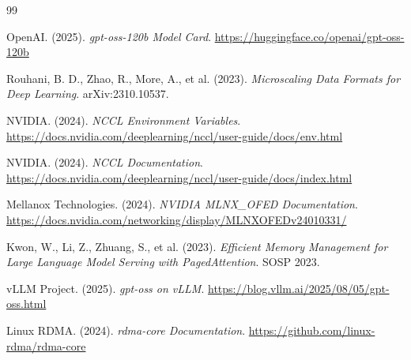 \documentclass[10pt,letterpaper]{article}
\begin{document}
\begin{thebibliography}{99}

OpenAI. (2025). \textit{gpt-oss-120b Model Card}. \url{https://huggingface.co/openai/gpt-oss-120b}

Rouhani, B. D., Zhao, R., More, A., et al. (2023). \textit{Microscaling Data Formats for Deep Learning}. arXiv:2310.10537.

NVIDIA. (2024). \textit{NCCL Environment Variables}. \url{https://docs.nvidia.com/deeplearning/nccl/user-guide/docs/env.html}

NVIDIA. (2024). \textit{NCCL Documentation}. \url{https://docs.nvidia.com/deeplearning/nccl/user-guide/docs/index.html}

Mellanox Technologies. (2024). \textit{NVIDIA MLNX\_OFED Documentation}. \url{https://docs.nvidia.com/networking/display/MLNXOFEDv24010331/}

Kwon, W., Li, Z., Zhuang, S., et al. (2023). \textit{Efficient Memory Management for Large Language Model Serving with PagedAttention}. SOSP 2023.

vLLM Project. (2025). \textit{gpt-oss on vLLM}. \url{https://blog.vllm.ai/2025/08/05/gpt-oss.html}

Linux RDMA. (2024). \textit{rdma-core Documentation}. \url{https://github.com/linux-rdma/rdma-core}

\end{thebibliography}
\end{document}

